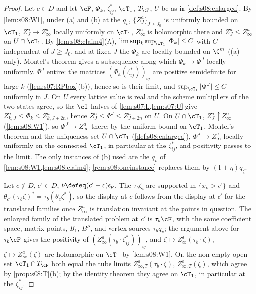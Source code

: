 \begin{proof}
Let $c\in D$ and let $\cF$, $\Phi_k$, $\zeta^*_{ij}$, $\cT_1$, $T_\cF$, $U$ be as in \cref{def:s08:enlarged}. By \cref{lem:s08:W1}, under \Wtwo(a) and \Wtwo(b) at the $q_v$, $\{Z^a_J\}_{J\ge J_0}$ is uniformly bounded on $\cT_1$, $Z^a_J\to Z^a_\infty$ locally uniformly on $\cT_1$, $Z^a_\infty$ is holomorphic there and $Z^a_J\le Z^a_\infty$ on $U\cap\cT_1$. By \cref{lem:s08:claim4}(A), $\limsup_k\sup_{\cT_1}|\Phi_k|\le C$ with $C$ independent of $J\ge J_0$, and at fixed $J$ the $\Phi_k$ are locally bounded on $\C^m$ (\Wtwo(a) only). Montel's theorem gives a subsequence along which $\Phi_k\to\Phi^J$ locally uniformly, $\Phi^J$ entire; the matrices $(\Phi_k(\zeta^*_{ij}))_{ij}$ are positive semidefinite for large $k$ (\cref{lem:s07:RPbox}(b)), hence so is their limit, and $\sup_{\cT_1}|\Phi^J|\le C$ uniformly in $J$. On $U$ every lattice value is real and the scheme multipliers of the two states agree, so the $\cI$ halves of \cref{lem:s07:L,lem:s07:U} give $Z^a_{k,J}\le\Phi_k\le Z^a_{k,J+2n}$, hence $Z^a_J\le\Phi^J\le Z^a_{J+2n}$ on $U$. On $U\cap\cT_1$, $Z^a_J\uparrow Z^a_\infty$ (\cref{lem:s08:W1}), so $\Phi^J\to Z^a_\infty$ there; by the uniform bound on $\cT_1$, Montel's theorem and the uniqueness set $U\cap\cT_1$ (\cref{def:s08:enlarged}), $\Phi^J\to Z^a_\infty$ locally uniformly on the connected $\cT_1$, in particular at the $\zeta^*_{ij}$, and positivity passes to the limit. The only instances of \Wtwo(b) used are the $q_v$ of \cref{lem:s08:W1,lem:s08:claim4}; \cref{rem:s08:oneinstance} replaces them by $(1+\eta)q_\zeta$.

Let $c\notin D$, $c'\in D$, $b\defeq(c'-c)e_\nu$. The $\tau_b\zeta_i$ are supported in $\{x_\nu>c'\}$ and $\theta_{c'}(\tau_b\zeta)^*=\tau_b(\theta_c\zeta^*)$, so the display at $c$ follows from the display at $c'$ for the translated families once $Z^a_\infty$ is translation invariant at the points in question. The enlarged family of the translated problem at $c'$ is $\tau_b\cF$, with the same coefficient space, matrix points, $B_1$, $B''$, and vertex sources $\tau_bq_v$; the argument above for $\tau_b\cF$ gives the positivity of $(Z^a_\infty(\tau_b\cdot\zeta^*_{ij}))_{ij}$, and $\zeta\mapsto Z^a_\infty(\tau_b\cdot\zeta)$, $\zeta\mapsto Z^a_\infty(\zeta)$ are holomorphic on $\cT_1$ by \cref{lem:s08:W1}. On the non-empty open set $\cT_1\cap T_\cF$ both equal the tube limits $Z^a_{\infty,T}(\tau_b\cdot\zeta)$, $Z^a_{\infty,T}(\zeta)$, which agree by \cref{prop:s08:T}(b); by the identity theorem they agree on $\cT_1$, in particular at the $\zeta^*_{ij}$.
\end{proof}

